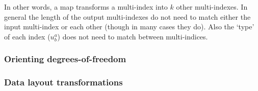 \vspace{1em}

In other words, a map transforms a multi-index into $k$ other multi-indexes.
In general the length of the output multi-indexes do not need to match either the input multi-index or each other (though in many cases they do).
Also the `type' of each index ($u^a_b$) does not need to match between multi-indices.





\subsubsection{Orienting degrees-of-freedom}
\label{sec:impl_orientation}



\subsubsection{Data layout transformations}
\label{sec:impl_datalayoutopt}


